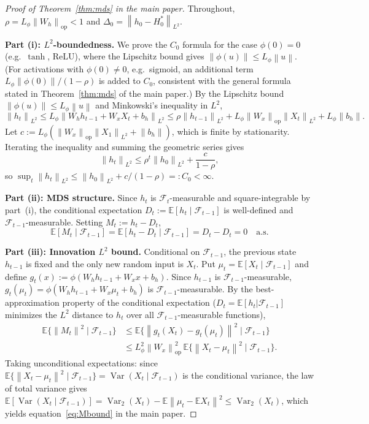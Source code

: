 \documentclass[bj,authoryear]{imsart}
\theoremstyle{plain}
\theoremstyle{definition}
\newcommand{\E}{\mathbb{E}}
\newcommand{\F}{\mathcal{F}}
\newcommand{\norm}[1]{\left\lVert #1 \right\rVert}
\newcommand{\given}{\mid}
\DeclareMathOperator{\Var}{Var}
\begin{document}
\begin{proof}[Proof of Theorem~\ref{thm:mds} in the main paper]
  Throughout, $\rho = L_\phi\norm{W_h}_{\mathrm{op}} < 1$ and
  $\Delta_0 = \norm{h_0 - H_0^*}_{L^2}$.

  \textbf{Part (i): $L^2$-boundedness.}
  We prove the $C_0$ formula for the case $\phi(0)=0$ (e.g.\ $\tanh$, ReLU),
  where the Lipschitz bound gives $\norm{\phi(u)} \leq L_\phi\norm{u}$.
  (For activations with $\phi(0)\neq 0$, e.g.\ sigmoid, an additional
  term $L_\phi\norm{\phi(0)}/(1-\rho)$ is added to $C_0$, consistent with the
  general formula stated in Theorem~\ref{thm:mds} of the main paper.)
  By the Lipschitz bound $\norm{\phi(u)}\leq L_\phi\norm{u}$ and
  Minkowski's inequality in $L^2$,
  \[
    \norm{h_t}_{L^2}
    \leq L_\phi\norm{W_hh_{t-1}+W_xX_t+b_h}_{L^2}
    \leq \rho\norm{h_{t-1}}_{L^2}
      + L_\phi\norm{W_x}_{\mathrm{op}}\norm{X_t}_{L^2}
      + L_\phi\norm{b_h}.
  \]
  Let $c := L_\phi(\norm{W_x}_{\mathrm{op}}\norm{X_1}_{L^2}+\norm{b_h})$,
  which is finite by stationarity.  Iterating the inequality and summing
  the geometric series gives
  \[
    \norm{h_t}_{L^2} \leq \rho^t\norm{h_0}_{L^2} + \frac{c}{1-\rho},
  \]
  so $\sup_t\norm{h_t}_{L^2} \leq \norm{h_0}_{L^2} + c/(1-\rho) =: C_0 < \infty$.

  \textbf{Part (ii): MDS structure.}
  Since $h_t$ is $\F_t$-measurable and square-integrable by part~(i),
  the conditional expectation $D_t := \E[h_t\given\F_{t-1}]$ is
  well-defined and $\F_{t-1}$-measurable.  Setting $M_t := h_t - D_t$,
  \[
    \E[M_t\given\F_{t-1}]
    = \E[h_t - D_t\given\F_{t-1}]
    = D_t - D_t = 0 \quad\text{a.s.}
  \]

  \textbf{Part (iii): Innovation $L^2$ bound.}
  Conditional on $\F_{t-1}$, the previous state $h_{t-1}$ is fixed and
  the only new random input is $X_t$.  Put $\mu_t = \E[X_t\mid\F_{t-1}]$
  and define $g_t(x) := \phi(W_h h_{t-1} + W_x x + b_h)$.
  Since $h_{t-1}$ is $\F_{t-1}$-measurable, $g_t(\mu_t) = \phi(W_hh_{t-1}+W_x\mu_t+b_h)$ is $\F_{t-1}$-measurable.
  By the best-approximation property of the conditional expectation ($D_t = \E[h_t|\F_{t-1}]$ minimizes the $L^2$ distance to $h_t$ over all $\F_{t-1}$-measurable functions),
  \begin{align*}
    \E\bigl\{\norm{M_t}^2\mid\F_{t-1}\bigr\}
    &\leq \E\bigl\{\norm{g_t(X_t) - g_t(\mu_t)}^2\mid\F_{t-1}\bigr\} \\
    &\leq L_\phi^2\norm{W_x}_{\mathrm{op}}^2\,
           \E\bigl\{\norm{X_t - \mu_t}^2\mid\F_{t-1}\bigr\}.
  \end{align*}
  Taking unconditional expectations: since
  $\E\{\norm{X_t-\mu_t}^2\mid\F_{t-1}\} = \Var(X_t\mid\F_{t-1})$ is the
  conditional variance, the law of total variance gives
  $\E[\Var(X_t\mid\F_{t-1})] = \Var_2(X_t) - \E\norm{\mu_t-\E X_t}^2
    \leq \Var_2(X_t)$,
  which yields equation~\eqref{eq:Mbound} in the main paper.


\end{proof}
\end{document}
